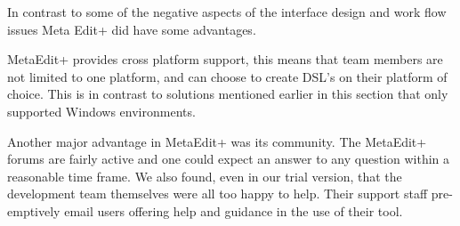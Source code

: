 In contrast to some of the negative aspects of the interface design and work flow issues Meta Edit+ did have some advantages.

MetaEdit+ provides cross platform support, this means that team members are not limited to one platform, and can choose to create DSL’s on their platform of choice. This is in contrast to solutions mentioned earlier in this section that only supported Windows environments. \par

Another major advantage in MetaEdit+ was its community. The MetaEdit+ forums are fairly active and one could expect an answer to any question within a reasonable time frame.  We also found, even in our trial version, that the development team themselves were all too happy to help. Their support staff pre-emptively email users offering help and guidance in the use of their tool.

